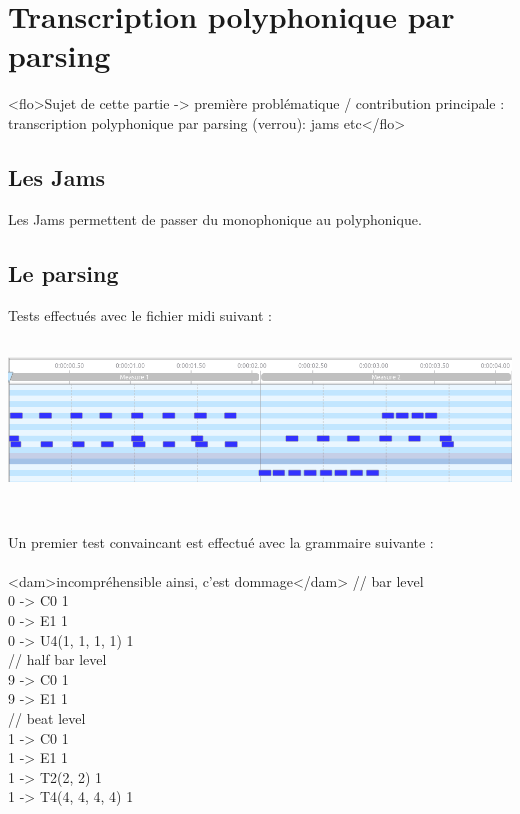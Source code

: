 \section{Transcription polyphonique par parsing}
<flo>Sujet de cette partie -> première problématique / contribution
principale : transcription polyphonique par parsing (verrou): jams etc</flo>

\subsection*{Les Jams}
Les Jams permettent de passer du monophonique au polyphonique.
\label{jam_tests}

\subsection*{Le parsing}
\label{gram_pond}

Tests effectués avec le fichier midi suivant :
\includegraphics[height=50mm, width=160mm]{z_images/4_experimentations/3_developpement/0_midi_2bars_fill.png}

Un premier test convaincant est effectué avec la grammaire suivante :\\\\
<dam>incompréhensible ainsi, c'est dommage</dam>
// bar level\\
0 -> C0                1\\
0 -> E1                1\\
0 -> U4(1, 1, 1, 1)    1\\

// half bar level\\
9 -> C0                1\\
9 -> E1                1\\

// beat level\\
1 -> C0                1\\
1 -> E1                1\\
1 -> T2(2, 2)          1\\
1 -> T4(4, 4, 4, 4)    1\\

